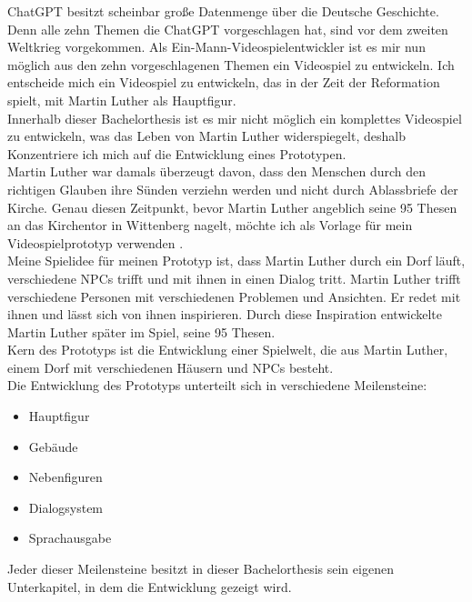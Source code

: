 ChatGPT besitzt scheinbar große Datenmenge über die Deutsche Geschichte. Denn alle zehn Themen die ChatGPT vorgeschlagen hat, sind vor dem zweiten Weltkrieg vorgekommen. Als Ein-Mann-Videospielentwickler ist es mir nun möglich aus den zehn vorgeschlagenen Themen ein Videospiel zu entwickeln. Ich entscheide mich ein Videospiel zu entwickeln, das in der Zeit der Reformation spielt, mit Martin Luther als Hauptfigur.
\\
Innerhalb dieser Bachelorthesis ist es mir nicht möglich ein komplettes Videospiel zu entwickeln, was das Leben von Martin Luther widerspiegelt, deshalb Konzentriere ich mich auf die Entwicklung eines Prototypen.
\\
Martin Luther war damals überzeugt davon, dass den Menschen durch den richtigen Glauben ihre Sünden verziehn werden und nicht durch Ablassbriefe der Kirche. Genau diesen Zeitpunkt, bevor Martin Luther angeblich seine 95 Thesen an das Kirchentor in Wittenberg nagelt, möchte ich als Vorlage für mein Videospielprototyp verwenden \autocite{MrWissen2goGeschichte2017}.
\\
Meine Spielidee für meinen Prototyp ist, dass Martin Luther durch ein Dorf läuft, verschiedene NPCs trifft und mit ihnen in einen Dialog tritt. Martin Luther trifft verschiedene Personen mit verschiedenen Problemen und Ansichten. Er redet mit ihnen und lässt sich von ihnen inspirieren. Durch diese Inspiration entwickelte Martin Luther später im Spiel, seine 95 Thesen.
\\
Kern des Prototyps ist die Entwicklung einer Spielwelt, die aus Martin Luther, einem Dorf mit verschiedenen Häusern und NPCs besteht.
\\
Die Entwicklung des Prototyps unterteilt sich in verschiedene Meilensteine:
\begin{itemize}
	\item Hauptfigur
	\item Gebäude
	\item Nebenfiguren
	\item Dialogsystem
	\item Sprachausgabe
\end{itemize}
Jeder dieser Meilensteine besitzt in dieser Bachelorthesis sein eigenen Unterkapitel, in dem die Entwicklung gezeigt wird.

